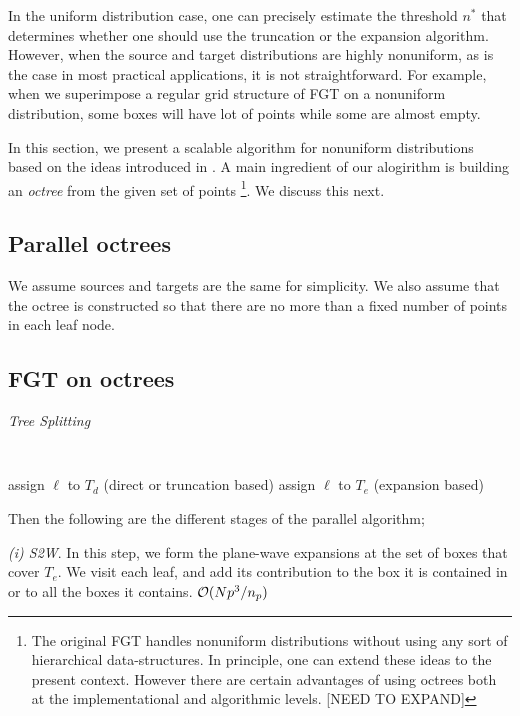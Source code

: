 In the uniform distribution case, one can precisely estimate the threshold $n^*$ that determines whether one should use the truncation or the expansion algorithm. However, when the source and target distributions are highly nonuniform, as is the case in most practical applications, it is not straightforward. For example, when we superimpose a regular grid structure of FGT on a nonuniform distribution, some boxes will have lot of points while some are almost empty. 

In this section, we present a scalable algorithm for nonuniform distributions based on the ideas introduced in \cite{veerapaneni08}. A main ingredient of our alogirithm is building an \emph{octree} from the given set of points%
%
\footnote{The original FGT \cite{fgt} handles nonuniform distributions without using any sort of hierarchical data-structures. In principle, one can extend these ideas to the present context. However there are certain advantages of using octrees both at the implementational and algorithmic levels. [NEED TO EXPAND]}. 
%
We discuss this next.
%
\subsection{Parallel octrees}
We assume sources and targets are the same for simplicity. We also assume that the octree is constructed so that there are no more than a fixed number of points in each leaf node. 

\subsection{FGT on octrees}


\begin{algorithm}[!h]
\caption{{\em Tree Splitting}}
{\tt
\begin{algorithmic}
\STATE
      \IF {$|\ell| > \sqrt{\delta}$}
          \STATE assign $\ell$ to $T_d$ (direct or truncation based)
      \ELSE
          \STATE assign $\ell$ to $T_e$ (expansion based)
      \ENDIF
  \ENDFOR
\STATE
\end{algorithmic}
}
\end{algorithm}


Then the following are the different stages of the parallel algorithm;

{\em (i) S2W}. In this step, we form the plane-wave expansions at the set of boxes that cover $T_e$. 
We visit each leaf, and add its contribution to the box it is contained in or to all the boxes it contains. \hfill $\mathcal{O}(N p^3/n_p)$

